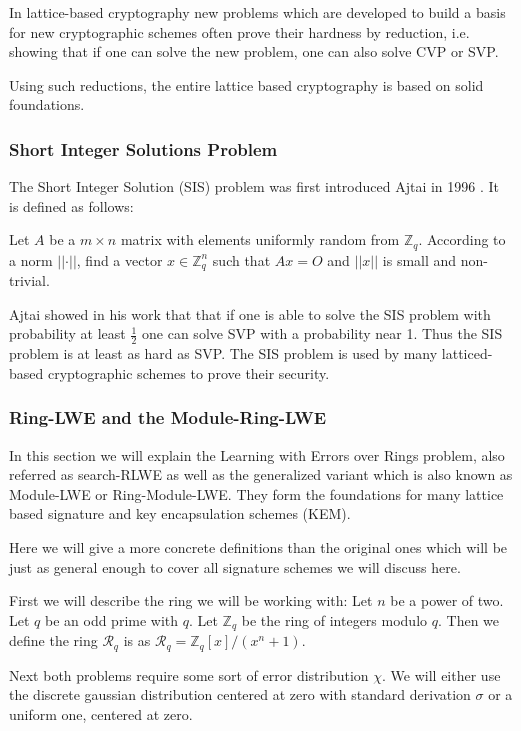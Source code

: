 \documentclass[a4paper,titlepage]{article}
\begin{document}
In lattice-based cryptography new problems which are developed to build a basis for new cryptographic schemes often prove their hardness by reduction, i.e. showing that if one can solve the new problem, one can also solve CVP or SVP.

Using such reductions, the entire lattice based cryptography is based on solid foundations.

\subsubsection{Short Integer Solutions Problem}
The Short Integer Solution (SIS) problem was first introduced Ajtai in 1996 \cite{sis}.
It is defined as follows:

Let $A$ be a  $m \times n$ matrix with elements uniformly random from $\mathds{Z}_q$. According to a norm $\lvert \lvert \cdot \rvert \rvert$, find a vector $x \in \mathds{Z}_q^n$ such that $Ax = O$ and $\lvert \lvert x \rvert \rvert$ is small and non-trivial.

Ajtai showed in his work \cite{sis}  that that if one is able to solve the SIS problem with probability at least $\frac{1}{2}$ one can solve SVP with a probability near 1. Thus the SIS problem is at least as hard as SVP. The SIS problem is used by many latticed-based cryptographic schemes to prove their security.






\subsubsection{Ring-LWE and the Module-Ring-LWE}
In this section we will explain the  Learning with Errors over Rings problem, also referred as search-RLWE as well as the generalized variant which is also known as Module-LWE or Ring-Module-LWE. They form the foundations for many lattice based signature and key encapsulation schemes (KEM).

Here we will give a more concrete definitions than the original ones \cite{rlwe,glwe} which will be just as general enough to cover all signature schemes we will discuss here.

First we will describe the ring we will be working with:
Let $n$ be a power of two. Let $q$ be an odd prime with $q$. Let $\mathds{Z}_q$ be the ring of integers modulo $q$. Then we define the ring $\mathcal{R}_q$ is as $\mathcal{R}_q = \mathds{Z}_q[x]/(x^n+1)$.
 
 Next both problems require some sort of error distribution $\chi$. We will either use the discrete gaussian distribution centered at zero with standard derivation $σ$ or a uniform one, centered at zero.
 
\end{document}

